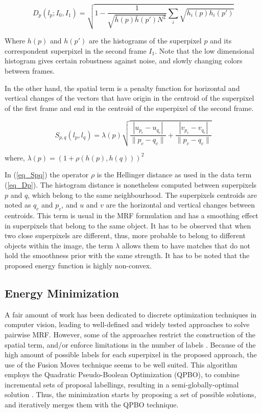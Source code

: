 \begin{equation}
D_p(l_p;I_0,I_1) = \sqrt{ 1 - \frac{1}{\sqrt{\bar{h}(p)\bar{h}(p')N^2} } \sum_{i}\sqrt{h_{i}(p)h_{i}(p')} }
\label{eq_Dp}
\end{equation}

Where $h(p)$ and $h(p')$ are the histograms of the superpixel $p$ and its correspondent superpixel in the
second frame $I_1$. %
Note that the low dimensional histogram gives certain robustness against noise,
and slowly changing colors between frames. 

In the other hand, the spatial term is a penalty function for horizontal
and vertical changes of the vectors that have origin in the centroid of the superpixel of the first frame and
end in the centroid of the superpixel of the second frame.

\begin{equation}
S_{p,q}(l_p, l_q) = \lambda(p)
  \sqrt{\frac{|u_{p_c}-u_{q_c}|}{\|p_c-q_c\|}+ \frac{|v_{p_c}-v_{q_c}|}{\|p_c-q_c\|}}
\label{eq_Spq}
\end{equation}
\begin{center}
 where, $ \lambda(p) = (1 + \rho(h(p),h(q)))^2 $ \\
\end{center}

In (\ref{eq_Spq}) the operator $\rho$ is the Hellinger distance as used in the
data term (\ref{eq_Dp}). The histogram distance is nonetheless computed between superpixels $p$ and $q$, 
which belong to the same neighbourhood. The superpixels centroids are noted as $q_c$ and $p_c$, 
and $u$ and $v$ are the horizontal and vertical changes between centroids.
This term is usual in the MRF formulation and has a smoothing effect in superpixels that belong to the
same object. It has to be observed that when two close superpixels are different, thus, more probable to
belong to different objects within the image, the term $\lambda$ allows them to have
matches that do not hold the smoothness prior with the same strength. 
It has to be noted that the proposed energy function is highly non-convex.

\subsection{Energy Minimization}

A fair amount of work has been dedicated to discrete optimization techniques in computer vision,
leading to well-defined and widely tested approaches to solve pairwise MRF\cite{c3}\cite{c4}.
However, some of the approaches restrict the construction of the spatial term, and/or enforce
limitations in the number of labels \cite{c3}.
Because of the high amount of possible labels for  each superpixel in the proposed approach, the use of the
Fusion Moves \cite{c7} technique seems to be well suited.
This algorithm employs the Quadratic Pseudo-Boolean Optimization (QPBO), to combine
incremental sets of proposal labellings, resulting in a semi-globally-optimal solution \cite{c4}.
Thus, the minimization starts by proposing a set of possible solutions, and iteratively merges them with
the QPBO technique. 

